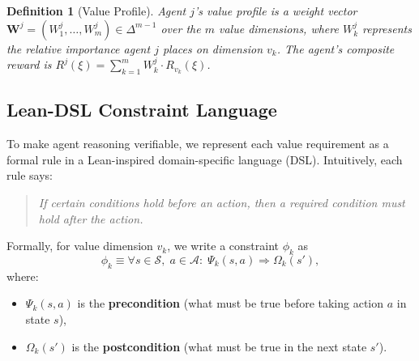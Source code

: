 \documentclass[12pt,a4paper]{article}
\newtheorem{definition}{Definition}[section]
\newcommand{\calS}{\mathcal{S}}
\newcommand{\calA}{\mathcal{A}}
\newcommand{\bW}{\bm{W}}
\begin{document}
\begin{definition}[Value Profile]
  Agent $j$'s \emph{value profile} is a weight vector $\bW^j = (W^j_1, \ldots,
  W^j_m) \in \Delta^{m-1}$ over the $m$ value dimensions, where $W^j_k$ represents
  the relative importance agent $j$ places on dimension $v_k$. The agent's composite
  reward is $R^j(\xi) = \sum_{k=1}^m W^j_k \cdot R_{v_k}(\xi)$.
\end{definition}



\subsection{Lean-DSL Constraint Language}

To make agent reasoning verifiable, we represent each value requirement as a formal rule
in a Lean-inspired domain-specific language (DSL). Intuitively, each rule says:

\begin{quote}
\emph{If certain conditions hold before an action, then a required condition must hold
after the action.}
\end{quote}

Formally, for value dimension $v_k$, we write a constraint $\phi_k$ as
\begin{equation}
  \phi_k \equiv \forall s \in \calS,\; a \in \calA:\; \Psi_k(s, a) \Rightarrow
  \Omega_k(s'),
  \label{eq:lean_constraint}
\end{equation}
where:
\begin{itemize}[leftmargin=*]
  \item $\Psi_k(s,a)$ is the \textbf{precondition} (what must be true before taking action $a$ in state $s$),
  \item $\Omega_k(s')$ is the \textbf{postcondition} (what must be true in the next state $s'$).
\end{itemize}
\end{document}
